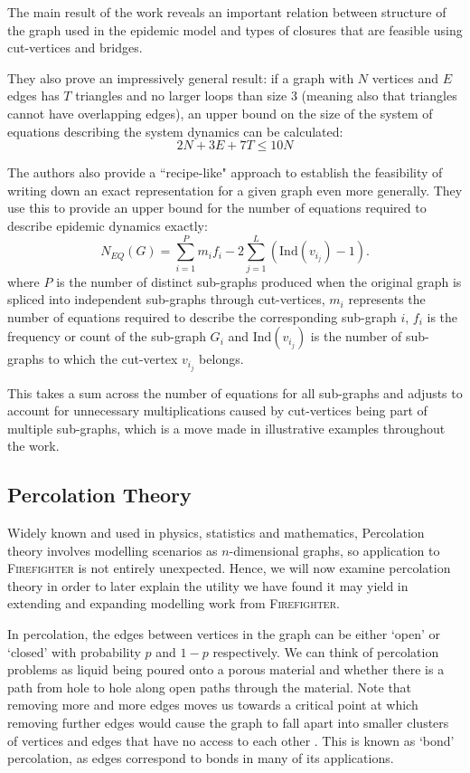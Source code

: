 \documentclass[../report.tex]{subfiles}
\begin{document}
The main result of the work reveals an important relation between structure of the graph used in the epidemic model and types of closures that are feasible using cut-vertices and bridges.

They also prove an impressively general result: if a graph with $N$ vertices and  $E$ edges has $T$ triangles and no larger loops than size 3 (meaning also that triangles cannot have overlapping edges), an upper bound on the size of the system of equations describing the system dynamics can be calculated:
$$
2N + 3E + 7T \leq 10N
$$

The authors also provide a ``recipe-like" approach to establish the feasibility of writing down an exact representation for a given graph even more generally. They use this to provide an upper bound for the number of equations required to describe epidemic dynamics exactly:
$$
\displaystyle N_{EQ}(G)=\sum^P_{i=1}m_if_i - 2\sum^{L}_{j=1}(\text{Ind}(v_{i_j})-1).
$$
where $P$ is the number of distinct sub-graphs produced when the original graph is spliced into independent sub-graphs through cut-vertices, $m_i$ represents the number of equations required to describe the corresponding sub-graph $i$, $f_i$ is the frequency or count of the sub-graph $G_i$ and $\text{Ind}(v_{i_j})$ is the number of sub-graphs to which the cut-vertex $v_{i_j}$ belongs.

This takes a sum across the number of equations for all sub-graphs and adjusts to account for unnecessary multiplications caused by cut-vertices being part of multiple sub-graphs, which is a move made in illustrative examples throughout the work.


\subsection{Percolation Theory}
\label{sec:perc}

Widely known and used in physics, statistics and mathematics, Percolation theory involves modelling scenarios as $n$-dimensional graphs, so application to {\scshape Firefighter} is not entirely unexpected. Hence, we will now examine percolation theory in order to later explain the utility we have found it may yield in extending and expanding modelling work from {\scshape Firefighter}.

In percolation, the edges between vertices in the graph can be either `open' or `closed' with probability $p$ and $1-p$ respectively. We can think of percolation problems as liquid being poured onto a porous material and whether there is a path from hole to hole along open paths through the material. Note that removing more and more edges moves us towards a critical point at which removing further edges would cause the graph to fall apart into smaller clusters of vertices and edges that have no access to each other \cite{grimmett_1999}. This is known as `bond' percolation, as edges correspond to bonds in many of its applications.
\end{document}
